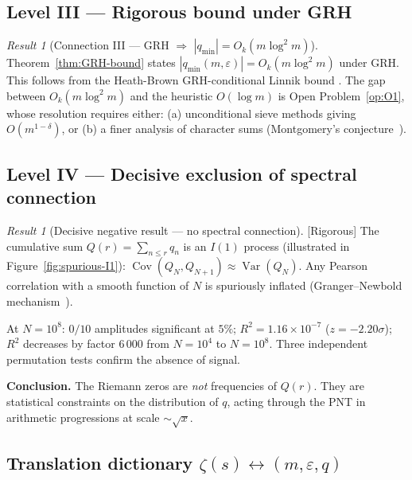 \documentclass[11pt,a4paper]{article}
\theoremstyle{definition}
\theoremstyle{remark}
\newtheorem{result}[theorem]{Result}
\newcommand{\Var}{\operatorname{Var}}
\newcommand{\Cov}{\operatorname{Cov}}
\newcommand{\qmin}{q_{\min}}
\newcommand{\eps}{\varepsilon}
\begin{document}
\subsection{Level III --- Rigorous bound under GRH}

\begin{rigorousbox}
\begin{result}[Connection III ---
GRH $\Rightarrow$ $|\qmin|=O_{k}(m\log^{2}m)$]\label{res:level-III}
Theorem~\ref{thm:GRH-bound} states $|\qmin(m,\eps)|=O_{k}(m\log^{2}m)$
under \textup{GRH}. This follows from the Heath-Brown
GRH-conditional Linnik bound \cite{HeathBrown1992}. The gap between
$O_{k}(m\log^{2}m)$ and the heuristic $O(\log m)$ is Open
Problem~\ref{op:O1}, whose resolution requires either: (a)
unconditional sieve methods giving $O(m^{1-\delta})$, or (b) a finer
analysis of character sums (Montgomery's
conjecture~\cite{Montgomery1973}).
\end{result}
\end{rigorousbox}

\subsection{Level IV --- Decisive exclusion of spectral connection}

\begin{negativebox}
\begin{result}[Decisive negative result --- no spectral connection]
\label{res:level-IV}
\textnormal{[Rigorous]} The cumulative sum
$Q(r)=\sum_{n\le r}q_{n}$ is an $I(1)$ process (illustrated in
Figure~\ref{fig:spurious-I1}): $\Cov(Q_{N},Q_{N+1})\approx\Var(Q_{N})$.
Any Pearson correlation with a smooth function of $N$ is spuriously
inflated (Granger--Newbold mechanism~\cite{GrangerNewbold1974}).

\smallskip
At $N=10^{8}$: $0/10$ amplitudes significant at $5\%$;
$R^{2}=1.16\times 10^{-7}$ ($z=-2.20\sigma$); $R^{2}$ decreases by
factor $6\,000$ from $N=10^{4}$ to $N=10^{8}$. Three independent
permutation tests confirm the absence of signal.

\smallskip
\noindent\textbf{Conclusion.} The Riemann zeros are \emph{not}
frequencies of $Q(r)$. They are statistical constraints on the
distribution of $q$, acting through the PNT in arithmetic
progressions at scale $\sim\sqrt{x}$.
\end{result}
\end{negativebox}

\subsection{Translation dictionary $\zeta(s)\leftrightarrow(m,\eps,q)$}
\end{document}
